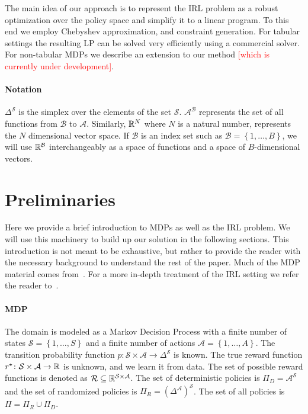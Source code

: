 \documentclass[11pt]{article}
\newcommand{\gersi}[1]{\textcolor{red}{[#1]}}
\begin{document}
The main idea of our approach is to represent the IRL problem as a robust optimization over the policy space and simplify it to a linear program. To this end we employ Chebyshev approximation, and constraint generation. For tabular settings the resulting LP can be solved very efficiently using a commercial solver. For non-tabular MDPs we describe an extension to our method \gersi{which is currently under development}.

\paragraph{Notation} $\Delta^{\mathcal{S}}$ is the simplex over the elements of the set $\mathcal{S}$. $\mathcal{A}^{\mathcal{B}}$ represents the set of all functions from $\mathcal{B}$ to $\mathcal{A}$. Similarly, $\mathbb{R}^N$ where $N$ is a natural number, represents the $N$ dimensional vector space.  If $\mathcal{B}$ is an index set such as $\mathcal{B} = \left\{ 1, \ldots , B \right\}$, we will use $\mathbb{R}^{\mathcal{B}}$ interchangeably as a space of functions and a space of $B$-dimensional
vectors.

\section{Preliminaries}\label{sec:preliminaries}

Here we provide a brief introduction to MDPs as well as the IRL problem. We will use this machinery to build up our solution in the following sections.
This introduction is not meant to be exhaustive, but rather to provide the reader with the necessary background to understand the rest of the paper.
Much of the MDP material comes from~\cite{PUTERMAN}. For a more in-depth treatment of the IRL setting we refer the reader to~\cite{abbeel2004}.

\paragraph{MDP}
The domain is modeled as a Markov Decision Process with a finite number of states $\mathcal{S} = \left\{ 1, \dots , S \right\}$ and a finite number of actions $\mathcal{A} = \left\{ 1, \dots , A \right\}$. The transition probability function $p\colon \mathcal{S} \times \mathcal{A} \to \Delta^{\mathcal{S}}$ is known. The true reward function $r^{\mathnormal{\star}} \colon \mathcal{S} \times \mathcal{A} \to \mathbb{R}$ is unknown, and we learn it from data. The set of possible reward functions is denoted as $\mathcal{R} \subseteq \mathbb{R}^{\mathcal{S} \times \mathcal{A}}$. The set of deterministic policies is $\Pi_D= \mathcal{A}^{\mathcal{S}}$ and the set of randomized policies is $\Pi_R = {\left(\Delta^{\mathcal{A}}\right)}^{\mathcal{S}}$. The set of all policies is $\Pi = \Pi_R \cup \Pi_D$.
\end{document}
